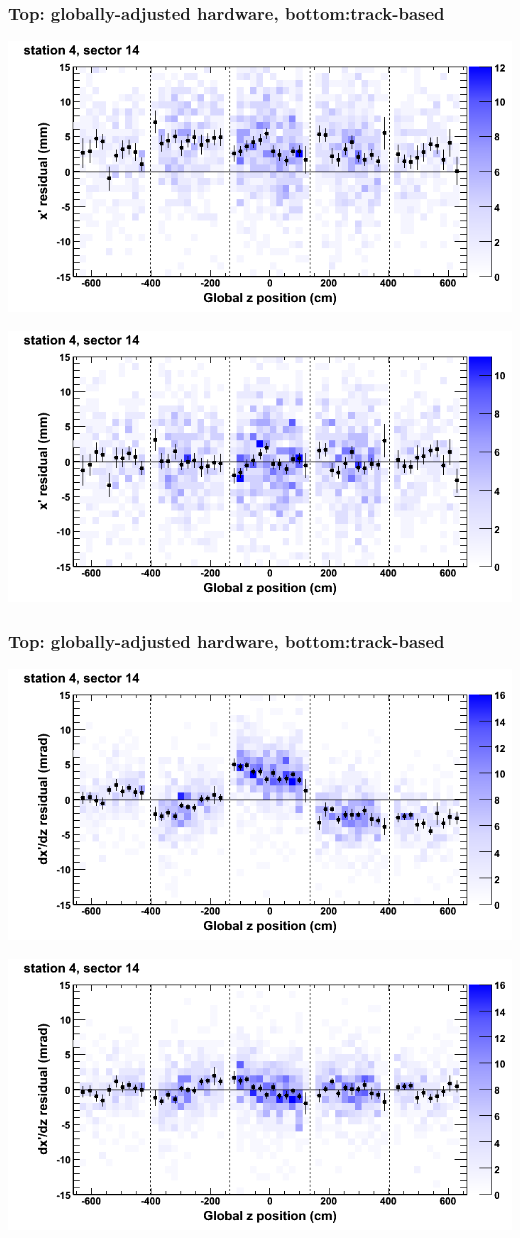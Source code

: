 \documentclass[compress]{beamer}
\begin{document}
\begin{frame}
\frametitle{Top: globally-adjusted hardware, bottom:track-based}
\includegraphics[width=0.7\linewidth]{NOV4_mapplots_HW/DTvsz_st4sec14_x.png}

\includegraphics[width=0.7\linewidth]{NOV4_mapplots/DTvsz_st4sec14_x.png}
\end{frame}

\begin{frame}
\frametitle{Top: globally-adjusted hardware, bottom:track-based}
\includegraphics[width=0.7\linewidth]{NOV4_mapplots_HW/DTvsz_st4sec14_dxdz.png}

\includegraphics[width=0.7\linewidth]{NOV4_mapplots/DTvsz_st4sec14_dxdz.png}
\end{frame}
\end{document}
